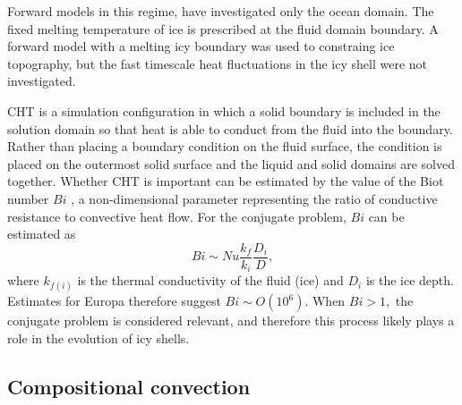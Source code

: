 \documentclass{article}
\def\lb{\left(}
\def\rb{\right)}
\begin{document}
Forward models in this regime\citep{kS19, dL23}, have investigated only the ocean domain. The fixed melting temperature of ice is prescribed at the fluid domain boundary.
A forward model with a melting icy boundary was used to constraing ice topography, but the fast timescale heat fluctuations in the icy shell were not investigated\citep{jK24}.


CHT is a simulation configuration in which a solid boundary is included in the solution domain so that heat is able to conduct from the fluid into the boundary. Rather than placing a boundary condition on the fluid surface, the condition is placed on the outermost solid surface and the liquid and solid domains are solved together\citep{dA09}. Whether CHT is important can be estimated by the value of the Biot number $Bi$ \citep{dA09,jL24}, a non-dimensional parameter representing the ratio of conductive resistance to convective heat flow. For the conjugate problem, $Bi$ can be estimated as
\[Bi \sim Nu\frac{k_{f}}{k_{i}}\frac{D_{i}}{D},\]
where $k_{f\lb i\rb }$ is the thermal conductivity of the fluid (ice) and $D_{i}$ is the ice depth.
Estimates for Europa therefore suggest $Bi \sim O\lb 10^{6}\rb$\citep{dL23}. When $Bi>1,$ the conjugate problem is considered relevant, and therefore this process likely plays a role in the evolution of icy shells.
\subsection{Compositional convection}
\end{document}
